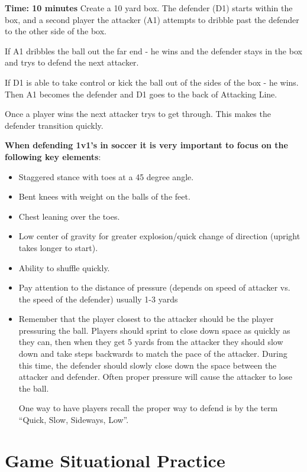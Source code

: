 \documentclass[10pt,letterpaper]{article}
\newenvironment{evenBlock}[1]{%
    \tcolorbox[beamer,%
    noparskip,breakable,
    colback=LightGreen,colframe=DarkGreen,%
    colbacklower=LimeGreen!75!LightGreen,%
    title=#1]}%
    {\endtcolorbox}
\begin{document}
\textbf{Time: 10 minutes}
\begin{evenBlock}{Box Defending}
Create a 10 yard box.  The defender (D1) starts within the box, and a second player the attacker (A1) attempts to dribble past the defender to the other side of the box.

If A1 dribbles the ball out the far end - he wins and the defender stays in the box and trys to defend the next attacker.

If D1 is able to take control or kick the ball out of the sides of the box - he wins.
Then A1 becomes the defender and D1 goes to the back of Attacking Line.

Once a player wins the next attacker trys to get through.  This makes the defender transition quickly.

\textbf{When defending 1v1’s in soccer it is very important to focus on the following key elements}:
\begin{itemize}
\item Staggered stance with toes at a 45 degree angle.
\item Bent knees with weight on the balls of the feet.
\item Chest leaning over the toes.
\item Low center of gravity for greater explosion/quick change of direction (upright takes longer to start).
\item Ability to shuffle quickly.
\item Pay attention to the distance of pressure (depends on speed of attacker vs. the speed of the defender) usually 1-3 yards
\item Remember that the player closest to the attacker should be the player pressuring the ball. Players should sprint to close down space as quickly as they can, then when they get 5 yards from the attacker they should slow down and take steps backwards to match the pace of the attacker. During this time, the defender should slowly close down the space between the attacker and defender. Often proper pressure will cause the attacker to lose the ball.

One way to have players recall the proper way to defend is by the term “Quick, Slow, Sideways, Low”.
\end{itemize}
\end{evenBlock}


%

\clearpage
\section{Game Situational Practice}
\end{document}
